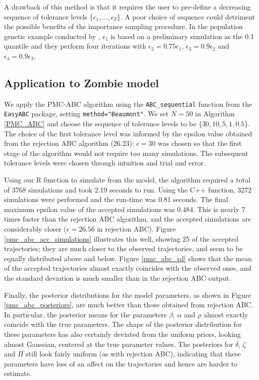 \documentclass[]{article}
\begin{document}
A drawback of this method is that it requires the user to pre-define a decreasing sequence of tolerance levels $\{\epsilon_1, ..., \epsilon_T\}$. A poor choice of sequence could detriment the possible benefits of the importance sampling procedure. In the population genetic example conducted by \cite{RN21}, $\epsilon_1$ is based on a preliminary simulation as the 0.1 quantile and they perform four iterations with $\epsilon_2 = 0.75\epsilon_1$, $\epsilon_3 = 0.9\epsilon_2$ and $\epsilon_4 = 0.9\epsilon_3$.

\subsection{Application to Zombie model}

We apply the PMC-ABC algorithm using the \texttt{ABC\_sequential} function from the \texttt{EasyABC} package, setting \texttt{method="Beaumont"}. We set $N=50$ in Algorithm \ref{PMC_ABC} and choose the sequence of tolerance levels to be $\{30, 10, 5, 1, 0.5\}$. The choice of the first tolerance level was informed by the epsilon value obtained from the rejection ABC algorithm (26.23): $\epsilon=30$ was chosen so that the first stage of the algorithm would not require too many simulations. The subsequent tolerance levels were chosen through intuition and trial and error.

Using our R function to simulate from the model, the algorithm required a total of 3768 simulations and took 2.19 seconds to run. Using the C++ function, 3272 simulations were performed and the run-time was 0.81 seconds. The final maximum epsilon value of the accepted simulations was 0.484. This is nearly 7 times faster than the rejection ABC algorithm, and the accepted simulations are considerably closer ($\epsilon= 26.56$ in rejection ABC). Figure \ref{pmc_abc_acc_simulations} illustrates this well, showing 25 of the accepted trajectories; they are much closer to the observed trajectories, and seem to be equally distributed above and below. Figure \ref{pmc_abc_sd} shows that the mean of the accepted trajectories almost exactly coincides with the observed ones, and the standard deviation is much smaller than in the rejection ABC output.

Finally, the posterior distributions for the model parameters, as shown in Figure \ref{pmc_abc_posteriors}, are much better than those obtained from rejection ABC. In particular, the posterior means for the parameters $\beta$, $\alpha$ and $\rho$ almost exactly coincide with the true parameters. The shape of the posterior distribution for these parameters has also certainly deviated from the uniform priors, looking almost Gaussian, centered at the true parameter values. The posteriors for $\delta$, $\zeta$ and $\Pi$ still look fairly uniform (as with rejection ABC), indicating that these parameters have less of an affect on the trajectories and hence are harder to estimate.
\end{document}
